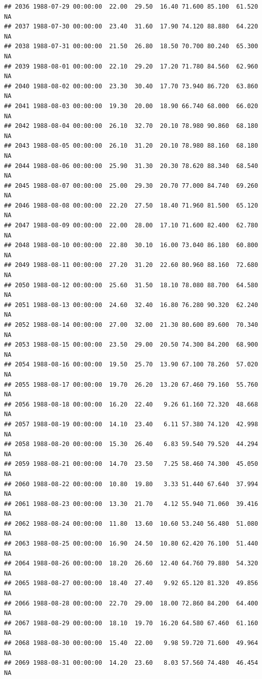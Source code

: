 \documentclass{article}\usepackage{graphicx, color}
\makeatletter
\newenvironment{kframe}{%
 \def\at@end@of@kframe{}%
 \ifinner\ifhmode%
  \def\at@end@of@kframe{\end{minipage}}%
  \begin{minipage}{\columnwidth}%
 \fi\fi%
 \def\FrameCommand##1{\hskip\@totalleftmargin \hskip-\fboxsep
 \colorbox{shadecolor}{##1}\hskip-\fboxsep
     \hskip-\linewidth \hskip-\@totalleftmargin \hskip\columnwidth}%
 \MakeFramed {\advance\hsize-\width
   \@totalleftmargin\z@ \linewidth\hsize
   \@setminipage}}%
 {\par\unskip\endMakeFramed%
 \at@end@of@kframe}
\newenvironment{knitrout}{}{} %
\makeatother
\begin{document}
\begin{knitrout}
\begin{kframe}
\begin{verbatim}
## 2036 1988-07-29 00:00:00  22.00  29.50  16.40 71.600 85.100  61.520     NA
## 2037 1988-07-30 00:00:00  23.40  31.60  17.90 74.120 88.880  64.220     NA
## 2038 1988-07-31 00:00:00  21.50  26.80  18.50 70.700 80.240  65.300     NA
## 2039 1988-08-01 00:00:00  22.10  29.20  17.20 71.780 84.560  62.960     NA
## 2040 1988-08-02 00:00:00  23.30  30.40  17.70 73.940 86.720  63.860     NA
## 2041 1988-08-03 00:00:00  19.30  20.00  18.90 66.740 68.000  66.020     NA
## 2042 1988-08-04 00:00:00  26.10  32.70  20.10 78.980 90.860  68.180     NA
## 2043 1988-08-05 00:00:00  26.10  31.20  20.10 78.980 88.160  68.180     NA
## 2044 1988-08-06 00:00:00  25.90  31.30  20.30 78.620 88.340  68.540     NA
## 2045 1988-08-07 00:00:00  25.00  29.30  20.70 77.000 84.740  69.260     NA
## 2046 1988-08-08 00:00:00  22.20  27.50  18.40 71.960 81.500  65.120     NA
## 2047 1988-08-09 00:00:00  22.00  28.00  17.10 71.600 82.400  62.780     NA
## 2048 1988-08-10 00:00:00  22.80  30.10  16.00 73.040 86.180  60.800     NA
## 2049 1988-08-11 00:00:00  27.20  31.20  22.60 80.960 88.160  72.680     NA
## 2050 1988-08-12 00:00:00  25.60  31.50  18.10 78.080 88.700  64.580     NA
## 2051 1988-08-13 00:00:00  24.60  32.40  16.80 76.280 90.320  62.240     NA
## 2052 1988-08-14 00:00:00  27.00  32.00  21.30 80.600 89.600  70.340     NA
## 2053 1988-08-15 00:00:00  23.50  29.00  20.50 74.300 84.200  68.900     NA
## 2054 1988-08-16 00:00:00  19.50  25.70  13.90 67.100 78.260  57.020     NA
## 2055 1988-08-17 00:00:00  19.70  26.20  13.20 67.460 79.160  55.760     NA
## 2056 1988-08-18 00:00:00  16.20  22.40   9.26 61.160 72.320  48.668     NA
## 2057 1988-08-19 00:00:00  14.10  23.40   6.11 57.380 74.120  42.998     NA
## 2058 1988-08-20 00:00:00  15.30  26.40   6.83 59.540 79.520  44.294     NA
## 2059 1988-08-21 00:00:00  14.70  23.50   7.25 58.460 74.300  45.050     NA
## 2060 1988-08-22 00:00:00  10.80  19.80   3.33 51.440 67.640  37.994     NA
## 2061 1988-08-23 00:00:00  13.30  21.70   4.12 55.940 71.060  39.416     NA
## 2062 1988-08-24 00:00:00  11.80  13.60  10.60 53.240 56.480  51.080     NA
## 2063 1988-08-25 00:00:00  16.90  24.50  10.80 62.420 76.100  51.440     NA
## 2064 1988-08-26 00:00:00  18.20  26.60  12.40 64.760 79.880  54.320     NA
## 2065 1988-08-27 00:00:00  18.40  27.40   9.92 65.120 81.320  49.856     NA
## 2066 1988-08-28 00:00:00  22.70  29.00  18.00 72.860 84.200  64.400     NA
## 2067 1988-08-29 00:00:00  18.10  19.70  16.20 64.580 67.460  61.160     NA
## 2068 1988-08-30 00:00:00  15.40  22.00   9.98 59.720 71.600  49.964     NA
## 2069 1988-08-31 00:00:00  14.20  23.60   8.03 57.560 74.480  46.454     NA

\end{verbatim}
\end{kframe}
\end{knitrout}
\end{document}
